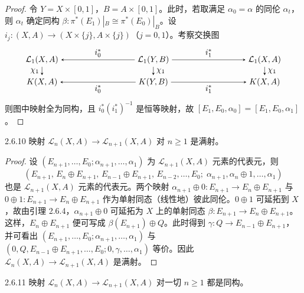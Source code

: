 \begin{proof}
  令 $Y=X\times[0,1]$，$B=A\times[0,1]$。此时，若取满足 $\alpha_0=\alpha$ 的同伦 $\alpha_t$，则 $\alpha_t$ 确定同构 $\beta\colon\pi^*(E_1)|_B\cong\pi^*(E_0)|_B$。设 $i_j\colon(X,A)\to(X\times\{j\},A\times\{j\})$（$j=0,1$）。考察交换图
  \[
  \begin{tikzpicture}[baseline=(current bounding box.center),>=stealth,scale=0.95]
  \node (TL) at (0,1)   {$\mathcal{L}_1(X,A)$};
  \node (TM) at (5,1)   {$\mathcal{L}_1(Y,B)$};
  \node (TR) at (10,1)  {$\mathcal{L}_1(X,A)$};
  \node (BL) at (0,0)   {$K(X,A)$};
  \node (BM) at (5,0)   {$K(Y,B)$};
  \node (BR) at (10,0)  {$K(X,A)$};
  \draw[->] (TM) -- node[above] {$i_0^*$} (TL);
  \draw[->] (TM) -- node[above] {$i_1^*$} (TR);
  \draw[->] (TM) -- node[right] {$\chi_1$} (BM);
  \draw[->] (TL) -- node[left] {$\chi_1$} (BL);
  \draw[->] (TR) -- node[right] {$\chi_1$} (BR);
  \draw[->] (BM) -- node[below] {$i_0^*$} (BL);
  \draw[->] (BM) -- node[below] {$i_1^*$} (BR);
  \end{tikzpicture}
  \]
  则图中映射全为同构，且 $i_0^*(i_1^*)^{-1}$ 是恒等映射，故 $[E_1,E_0,\alpha_0]=[E_1,E_0,\alpha_1]$。
\end{proof}

\begin{lemma*}{2.6.10}
  映射 $\mathcal{L}_n(X,A)\to\mathcal{L}_{n+1}(X,A)$ 对 $n\ge1$ 是满射。
\end{lemma*}

\begin{proof}
  设 $(E_{n+1},\dots,E_0;\alpha_{n+1},\dots,\alpha_1)$ 为 $\mathcal{L}_{n+1}(X,A)$ 元素的代表元，则
  \[
  (E_{n+1},\,E_n\oplus E_{n+1},\,E_{n-1}\oplus E_{n+1},\,E_{n-2},\dots,E_0;\;\alpha_{n+1},\alpha_n\oplus1,\dots,\alpha_1)
  \]
  也是 $\mathcal{L}_{n+1}(X,A)$ 元素的代表元。两个映射 $\alpha_{n+1}\oplus0\colon E_{n+1}\to E_n\oplus E_{n+1}$ 与 $0\oplus1\colon E_{n+1}\to E_n\oplus E_{n+1}$ 作为单射同态（线性地）彼此同伦。$0\oplus1$ 可延拓到 $X$，故由引理 2.6.4，$\alpha_{n+1}\oplus0$ 可延拓为 $X$ 上的单射同态 $\beta\colon E_{n+1}\to E_n\oplus E_{n+1}$。这样，$E_n\oplus E_{n+1}$ 便可写成
  $\beta(E_{n+1})\oplus Q$。此时得到 $\gamma\colon Q\to E_{n-1}\oplus E_{n+1}$，并可看出 $(E_{n+1},\dots,E_0;\alpha_{n+1},\dots,\alpha_1)$ 与 $(0,Q,E_{n-1}\oplus E_{n+1},\dots,E_0;0,\gamma,\dots,\alpha_1)$ 等价。因此 $\mathcal{L}_n(X,A)\to\mathcal{L}_{n+1}(X,A)$ 是满射。
\end{proof}

\begin{lemma*}{2.6.11}
  映射 $\mathcal{L}_n(X,A)\to\mathcal{L}_{n+1}(X,A)$ 对一切 $n\ge1$ 都是同构。
\end{lemma*}

